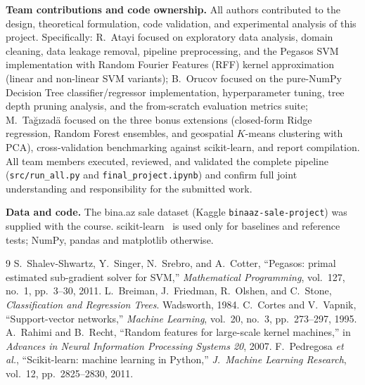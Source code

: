 \documentclass[10pt,twocolumn,a4paper]{article}
\begin{document}
\textbf{Team contributions and code ownership.} All authors contributed to the design, theoretical formulation, code validation, and experimental analysis of this project. Specifically: R.~Atayi focused on exploratory data analysis, domain cleaning, data leakage removal, pipeline preprocessing, and the Pegasos SVM implementation with Random Fourier Features (RFF) kernel approximation (linear and non-linear SVM variants); B.~Orucov focused on the pure-NumPy Decision Tree classifier/regressor implementation, hyperparameter tuning, tree depth pruning analysis, and the from-scratch evaluation metrics suite; M.~Ta{\u{g}}{\i}zad{\"{a}} focused on the three bonus extensions (closed-form Ridge regression, Random Forest ensembles, and geospatial $K$-means clustering with PCA), cross-validation benchmarking against scikit-learn, and report compilation. All team members executed, reviewed, and validated the complete pipeline (\texttt{src/run\_all.py} and \texttt{final\_project.ipynb}) and confirm full joint understanding and responsibility for the submitted work.

\textbf{Data and code.} The bina.az sale dataset (Kaggle \texttt{binaaz-sale-project}) was supplied with the course. scikit-learn~\cite{sklearn} is used only for baselines and reference tests; NumPy, pandas and matplotlib otherwise.

\begin{thebibliography}{9}
S.~Shalev-Shwartz, Y.~Singer, N.~Srebro, and A.~Cotter,
``Pegasos: primal estimated sub-gradient solver for SVM,''
\emph{Mathematical Programming}, vol.~127, no.~1, pp.~3--30, 2011.
L.~Breiman, J.~Friedman, R.~Olshen, and C.~Stone,
\emph{Classification and Regression Trees}. Wadsworth, 1984.
C.~Cortes and V.~Vapnik, ``Support-vector networks,''
\emph{Machine Learning}, vol.~20, no.~3, pp.~273--297, 1995.
A.~Rahimi and B.~Recht, ``Random features for large-scale kernel machines,''
in \emph{Advances in Neural Information Processing Systems 20}, 2007.
F.~Pedregosa \emph{et al.}, ``Scikit-learn: machine learning in Python,''
\emph{J.\ Machine Learning Research}, vol.~12, pp.~2825--2830, 2011.
\end{thebibliography}
\end{document}
